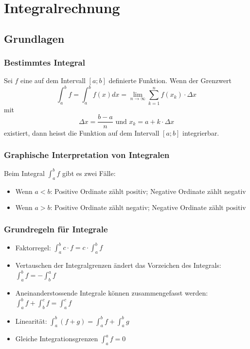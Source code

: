 \section{Integralrechnung}
\subsection{Grundlagen}
\subsubsection{Bestimmtes Integral}
Sei $f$ eine auf dem Intervall $[a;b]$ definierte Funktion. Wenn der
Grenzwert
\[ \int^b_a f = \int^b _a f(x) dx =
  \lim_{n \to \infty} \sum_{k=1}^{n}f(x_k) \cdot \Delta x
\]
mit 
\[ \Delta x = \frac{b-a}{n} \text{ und } x_k = a + k \cdot \Delta x\]
existiert, dann heisst die Funktion auf dem Intervall $[a;b]$
integrierbar.

\subsubsection{Graphische Interpretation von Integralen}
Beim Integral $\int_{a}^{b}f$ gibt es zwei Fälle:
\begin{itemize}
  \item Wenn $a < b$: Positive Ordinate zählt positiv;
    Negative Ordinate zählt negativ
  \item Wenn $a > b$: Positive Ordinate zählt negativ;
    Negative Ordinate zählt positiv
\end{itemize}

\subsubsection{Grundregeln für Integrale}
\begin{itemize}
  \item Faktorregel: $\int_{a}^{b}c \cdot f = c \cdot \int_{a}^{b}f$
  \item Vertauschen der Integralgrenzen ändert das Vorzeichen des Integrals:
    $\int_{a}^{b}f = - \int_{b}^{a}f$
  \item Aneinanderstossende Integrale können zusammengefasst werden:
    $\int_{a}^{b}f + \int_{b}^{c}f = \int_{a}^{c}f$
  \item Linearität: $\int_{a}^{b}(f+g) = \int_{a}^{b}f + \int_{a}^{b}g$
  \item Gleiche Integrationsgrenzen $\int_{a}^{a} f = 0$
\end{itemize}


